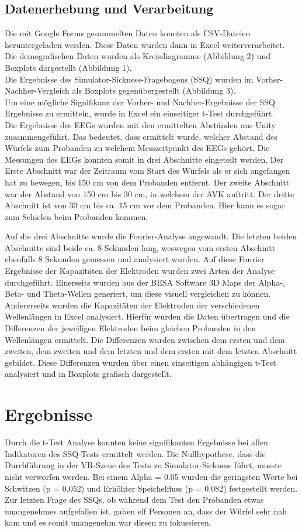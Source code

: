 \documentclass[conference]{IEEEtran}
\begin{document}
\subsection{Datenerhebung und Verarbeitung}
Die mit Google Forms gesammelten Daten konnten als CSV-Dateien heruntergeladen werden. Diese Daten wurden dann in Excel weiterverarbeitet. Die demografischen Daten wurden als Kreisdiagramme (Abbildung 2) und Boxplots dargestellt (Abbildung 1).\\
Die Ergebnisse des Simulator-Sickness-Fragebogens (SSQ) wurden im Vorher-Nachher-Vergleich als Boxplots gegenübergestellt (Abbildung 3).\\
Um eine mögliche Signifikanz der Vorher- und Nachher-Ergebnisse der SSQ Ergebnisse zu ermitteln, wurde in Excel ein einseitiger t-Test durchgeführt.\\ 
Die Ergebnisse des EEGs wurden mit den ermittelten Abständen aus Unity zusammengeführt. Das bedeutet, dass ermittelt wurde, welcher Abstand des Würfels zum Probanden zu welchem Messzeitpunkt des EEGs gehört. Die Messungen des EEGs konnten somit in drei Abschnitte eingeteilt werden. Der Erste Abschnitt war der Zeitraum vom Start des Würfels als er sich angefangen hat zu bewegen, bis 150 cm von dem Probanden entfernt. Der zweite Abschnitt war der Abstand von 150 cm bis 30 cm, in welchem der AVK auftritt. Der dritte Abschnitt ist von 30 cm bis ca. 15 cm vor dem Probanden. Hier kann es sogar zum Schielen beim Probanden kommen.

Auf die drei Abschnitte wurde die Fourier-Analyse angewandt. Die letzten beiden Abschnitte sind beide ca. 8 Sekunden lang, weswegen vom ersten Abschnitt ebenfalls 8 Sekunden gemessen und analysiert wurden.
Auf diese Fourier Ergebnisse der Kapazitäten der Elektroden wurden zwei Arten der Analyse durchgeführt. Einerseits wurden aus der BESA Software 3D Maps der Alpha-, Beta- und Theta-Wellen generiert, um diese visuell vergleichen zu können. Andererseits wurden die Kapazitäten der Elektroden der verschiedenen Wellenlängen in Excel analysiert. Hierfür wurden die Daten übertragen und die Differenzen der jeweiligen Elektroden beim gleichen Probanden in den Wellenlängen ermittelt. Die Differenzen wurden zwischen dem ersten und dem zweiten, dem zweiten und dem letzten und dem ersten mit dem letzten Abschnitt gebildet. Diese Differenzen wurden über einen einseitigen abhängigen t-Test analysiert und in Boxplots grafisch dargestellt.


\section{Ergebnisse}
Durch die t-Test Analyse konnten keine signifikanten Ergebnisse bei allen Indikatoren des SSQ-Tests ermittelt werden. Die Nullhypothese, dass die Durchführung in der VR-Szene des Tests zu Simulator-Sickness führt, musste nicht verworfen werden. Bei einem Alpha = 0.05 wurden die geringsten Werte bei Schwitzen (p = 0,052) und Erhöhter Speichelfluss (p = 0,082) festgestellt werden. Zur letzten Frage des SSQs, ob während dem Test den Probanden etwas unangenehmes aufgefallen ist, gaben elf Personen an, dass der Würfel sehr nah kam und es somit unangenehm war diesen zu fokussieren.\\
\end{document}
